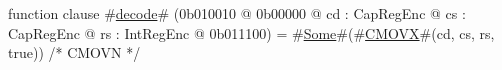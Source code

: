 function clause #\hyperref[zdecode]{decode}# (0b010010 @ 0b00000 @ cd : CapRegEnc @ cs : CapRegEnc @ rs : IntRegEnc @ 0b011100) = #\hyperref[zSome]{Some}#(#\hyperref[zCMOVX]{CMOVX}#(cd, cs, rs, true))  /* CMOVN */
